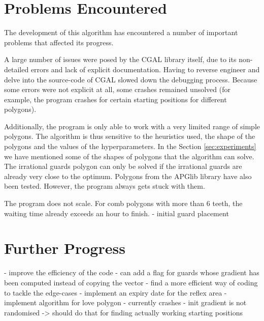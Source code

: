 \section{Problems Encountered}
The development of this algorithm has encountered a number of important problems that affected its progress.

A large number of issues were posed by the CGAL library itself, due to its non-detailed errors and lack of explicit documentation. Having to reverse engineer and delve into the source-code of CGAL slowed down the debugging process. Because some errors were not explicit at all, some crashes remained unsolved (for example, the program crashes for certain starting positions for different polygons).

Additionally, the program is only able to work with a very limited range of simple polygons. The algorithm is thus sensitive to the heuristics used, the shape of the polygons and the values of the hyperparameters. In the Section \ref{sec:experiments} we have mentioned some of the shapes of polygons that the algorithm can solve. 
The irrational guards polygon can only be solved if the irrational guards are already very close to the optimum. Polygons from the APGlib library \cite{art-gallery-instances-page} have also been tested. However, the program always gets stuck with them.

The program does not scale. For comb polygons with more than 6 teeth, the waiting time already exceeds an hour to finish.
- initial guard placement


\section{Further Progress}
- improve the efficiency of the code
    - can add a flag for guards whose gradient has been computed instead of copying the vector
- find a more efficient way of coding to tackle the edge-cases
- implement an expiry date for the reflex area
- implement algorithm for love polygon - currently crashes 
- init gradient is not randomised -> should do that for finding actually working starting positions